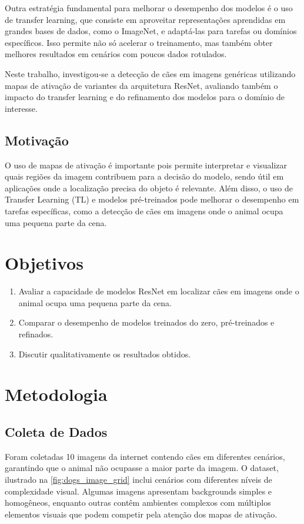 \documentclass[%
 reprint,
 amsmath,amssymb,
 aps,
]{revtex4-2}
\begin{document}
Outra estratégia fundamental para melhorar o desempenho dos modelos é o uso de transfer learning, que consiste em aproveitar representações aprendidas em grandes bases de dados, como o ImageNet, e adaptá-las para tarefas ou domínios específicos. Isso permite não só acelerar o treinamento, mas também obter melhores resultados em cenários com poucos dados rotulados.

Neste trabalho, investigou-se a detecção de cães em imagens genéricas utilizando mapas de ativação de variantes da arquitetura ResNet, avaliando também o impacto do transfer learning e do refinamento dos modelos para o domínio de interesse.

\subsection{Motivação}

O uso de mapas de ativação é importante pois permite interpretar e visualizar quais regiões da imagem contribuem para a decisão do modelo, sendo útil em aplicações onde a localização precisa do objeto é relevante. Além disso, o uso de Transfer Learning (TL) e modelos pré-treinados pode melhorar o desempenho em tarefas específicas, como a detecção de cães em imagens onde o animal ocupa uma pequena parte da cena.

\section{Objetivos}
\begin{enumerate}
    \item Avaliar a capacidade de modelos ResNet em localizar cães em imagens onde o animal ocupa uma pequena parte da cena.
    \item Comparar o desempenho de modelos treinados do zero, pré-treinados e refinados.
    \item Discutir qualitativamente os resultados obtidos.
\end{enumerate}

\section{Metodologia}
\subsection{Coleta de Dados}

Foram coletadas 10 imagens da internet contendo cães em diferentes cenários, garantindo que o animal não ocupasse a maior parte da imagem. O dataset, ilustrado na \ref{fig:dogs_image_grid} inclui cenários com diferentes níveis de complexidade visual. Algumas imagens apresentam backgrounds simples e homogêneos, enquanto outras contêm ambientes complexos com múltiplos elementos visuais que podem competir pela atenção dos mapas de ativação. 
\end{document}
